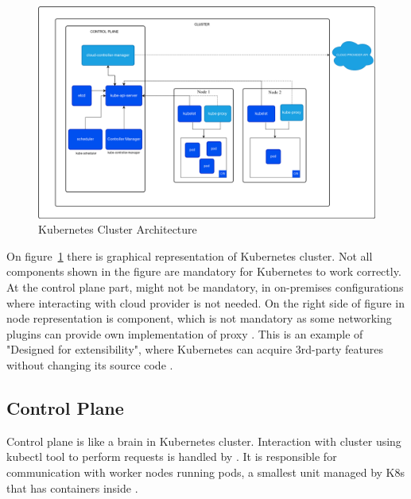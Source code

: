 \begin{figure}[tbh]
    \centering
    \includegraphics[width=1\columnwidth]{images/kubernetes-cluster-architecture.png}
    \caption{Kubernetes Cluster Architecture \cite{KubernetesArch}}
    \label{fig:k8s_arch}
\end{figure}

On figure~\ref{fig:k8s_arch} there is graphical representation of Kubernetes cluster. Not all components shown in the figure are mandatory for Kubernetes to work correctly. At the control plane part, \textit{} might not be mandatory, in on-premises configurations where interacting with cloud provider is not needed. On the right side of figure in node representation is \textit{} component, which is not mandatory as some networking plugins can provide own implementation of proxy \cite{KubernetesArch}. This is an example of "Designed for extensibility", where Kubernetes can acquire 3rd-party features without changing its source code \cite{KubernetesDocs}.





\subsection{Control Plane}
\label{sec:k8s_cplane}

Control plane is like a brain in Kubernetes cluster. Interaction with cluster using kubectl tool to perform requests is handled by \textit{}. It is responsible for communication with worker nodes running pods, a smallest unit managed by K8s that has containers inside \cite{KubernetesArch}.

